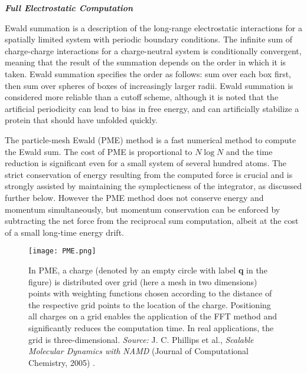 \begin{center}
{\textbf{\textit{Full Electrostatic Computation}}}
\end{center}
Ewald summation is a description of the long-range electrostatic interactions for a spatially limited system with periodic boundary conditions. The infinite sum of charge-charge interactions for a charge-neutral system is conditionally convergent, meaning that the result of the summation depends on the order in which it is taken. Ewald summation specifies the order as follows: sum over each box first, then sum over spheres of boxes of increasingly larger radii. Ewald summation is considered more reliable than a cutoff scheme, although it is noted that the artificial periodicity can lead to bias in free energy, and can artificially stabilize a protein that should have unfolded quickly.

The particle-mesh Ewald (PME) method is a fast numerical method to compute the Ewald sum. The cost of PME is proportional to $N \log N$ and the time reduction is significant even for a small system of several hundred atoms. 
The strict conservation of energy resulting from the computed force is crucial and is strongly assisted by maintaining the symplecticness of the integrator, as discussed further below.
However the PME method does not conserve energy and momentum simultaneously, but momentum conservation can be enforced by subtracting the net force from the reciprocal sum computation, albeit at the cost of a small long-time energy drift.

\begin{figure}[H]
\centering
\begin{minipage}[t]{0.8\textwidth}
	\centering
    \texttt{[image: PME.png]}
    
    \footnotesize{\caption{In PME, a charge (denoted by an empty circle with label \textbf{q} in the figure) is distributed over grid (here a mesh in two dimensions) points with weighting functions chosen according to the distance of the respective grid points to the location of the charge. Positioning all charges on a grid enables the application of the FFT method and significantly reduces the computation time. In real applications, the grid is three-dimensional.
    \textit{Source:} J. C. Phillips et al., \textit{Scalable Molecular Dynamics with NAMD} (Journal of Computational Chemistry, 2005) 
    \cite{ref:NAMD}.}
    \label{fig:PME}
    }
\end{minipage} 
\end{figure}

